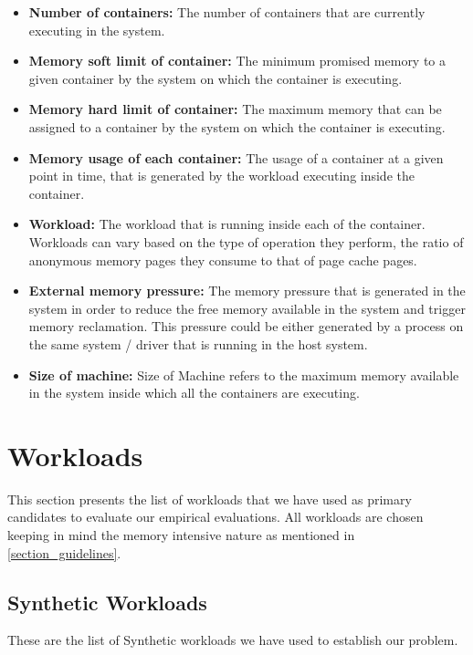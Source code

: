     \begin{itemize}
      \item \textbf{Number of containers:} The number of containers that are currently executing in the system.
      \item \textbf{Memory soft limit of container:} The minimum promised memory to a given container by the system on which the 
container is executing.
      \item \textbf{Memory hard limit of container:} The maximum memory that can be assigned to a container by the system on which the 
container is executing.
      \item \textbf{Memory usage of each container:} The usage of a container at a given point in time, that is generated by the workload 
executing inside the container.
      \item \textbf{Workload:} The workload that is running inside each of the container. Workloads can vary based on the type of operation 
they perform, the ratio of anonymous memory pages they consume to that of page cache pages.  
      \item \textbf{External memory pressure:} The memory pressure that is generated in the system in order to reduce the free memory 
available in the system and trigger memory reclamation. This pressure could be either generated by a process on the same system / driver 
that is running in the host system.
      \item \textbf{Size of machine:} Size of Machine refers to the maximum memory available in the system inside which all the 
containers are executing.      
    \end{itemize}  
    
  \section{Workloads}
  
    This section presents the list of workloads that we have used as primary candidates to evaluate our empirical evaluations. All 
workloads are chosen keeping in mind the memory intensive nature as mentioned in \ref{section_guidelines}.  
    
    \subsection{Synthetic Workloads}
    
      These are the list of Synthetic workloads we have used to establish our problem.
      
